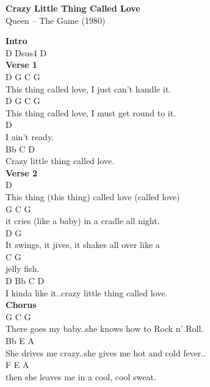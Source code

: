 \documentclass[a4paper]{article}
\begin{document}
    \begin{center}
        \textbf{Crazy Little Thing Called Love}
        ~\\
        Queen -- The Game (1980)
    \end{center}
    {
        \scriptsize
        \textbf{Intro}
        ~\\
        {
            \cutive
            \obeyspaces
D Dsus4 D
\\

        }
        \textbf{Verse 1}
        ~\\
        {
            \cutive
            \obeyspaces
     D                    G          C      G
\\
This thing called love, I just can't handle it.
\\
     D                    G        C        G
\\
This thing called love, I must get round to it.
\\
        D
\\
I ain't ready.
\\
Bb           C            D
\\
Crazy little thing called love.
\\

        }
        \textbf{Verse 2}
        ~\\
        {
            \cutive
            \obeyspaces
     D
\\
This thing (this thing) called love (called love)
\\
   G                        C          G
\\
it cries (like a baby) in a cradle all night.
\\
   D                    G
\\
It swings, it jives, it shakes all over like a 
\\
C     G
\\
jelly fish.
\\
        D        Bb           C            D
\\
I kinda like it..crazy little thing called love.
\\

        }
        \textbf{Chorus}
        ~\\
        {
            \cutive
            \obeyspaces
              G         C            G
\\
There goes my baby..she knows how to Rock n' Roll.
\\
              Bb                  E            A
\\
She drives me crazy..she gives me hot and cold fever..
\\
         F                               E A
\\
then she leaves me in a cool, cool sweat.
\\

}}
\end{document}
